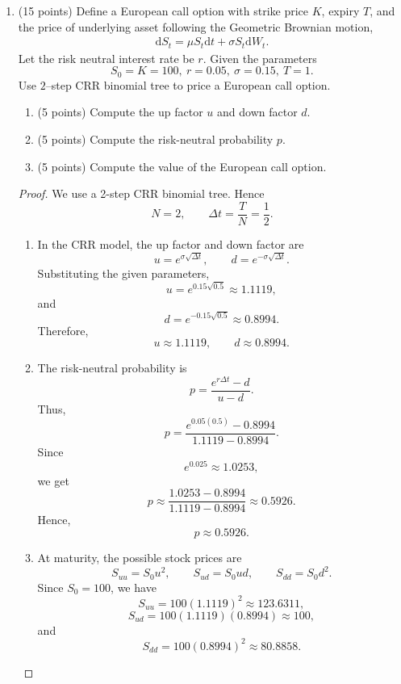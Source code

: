 \documentclass[a4paper,12pt]{article}
\begin{document}
\begin{enumerate}
\begin{enumerate}[label=(\arabic*)]
\textbf{Correct answers: A, B, C, D}
\end{enumerate}
\newpage
\item (15 points) Define a European call option with strike price $K$, expiry $T$, and the price of underlying asset following the Geometric Brownian motion, 
\begin{align*}
\mathrm{d}S_t=\mu S_t\mathrm{d}t+\sigma S_t\mathrm{d}W_t.
\end{align*}
Let the risk neutral interest rate be $r$. Given the parameters
\[ S_0 = K = 100,\ r=0.05,\ \sigma=0.15,\ T=1. \]
{Use $2$--step CRR binomial tree to price a European call option. }
\begin{enumerate}
 \item (5 points) Compute the up factor $u$ and down factor $d$.
 \item (5 points) Compute the risk-neutral probability $p$.
  \item (5 points) Compute the value of the European call option.
\end{enumerate}
\begin{proof}\mbox{}
We use a 2-step CRR binomial tree. Hence
\[
N=2,\qquad \Delta t=\frac{T}{N}=\frac{1}{2}.
\]

\begin{enumerate}
    \item In the CRR model, the up factor and down factor are
    \[
    u=e^{\sigma\sqrt{\Delta t}},
    \qquad
    d=e^{-\sigma\sqrt{\Delta t}}.
    \]
    Substituting the given parameters,
    \[
    u=e^{0.15\sqrt{0.5}}
    \approx 1.1119,
    \]
    and
    \[
    d=e^{-0.15\sqrt{0.5}}
    \approx 0.8994.
    \]
    Therefore,
    \[
    \boxed{u\approx 1.1119,\qquad d\approx 0.8994.}
    \]

    \item The risk-neutral probability is
    \[
    p=\frac{e^{r\Delta t}-d}{u-d}.
    \]
    Thus,
    \[
    p
    =
    \frac{e^{0.05(0.5)}-0.8994}{1.1119-0.8994}.
    \]
    Since
    \[
    e^{0.025}\approx 1.0253,
    \]
    we get
    \[
    p
    \approx
    \frac{1.0253-0.8994}{1.1119-0.8994}
    \approx 0.5926.
    \]
    Hence,
    \[
    \boxed{p\approx 0.5926.}
    \]

    \item At maturity, the possible stock prices are
    \[
    S_{uu}=S_0u^2,
    \qquad
    S_{ud}=S_0ud,
    \qquad
    S_{dd}=S_0d^2.
    \]
    Since \(S_0=100\), we have
    \[
    S_{uu}=100(1.1119)^2\approx 123.6311,
    \]
    \[
    S_{ud}=100(1.1119)(0.8994)\approx 100,
    \]
    and
    \[
    S_{dd}=100(0.8994)^2\approx 80.8858.
    \]


\end{enumerate}
\end{proof}
\end{enumerate}
\end{document}
